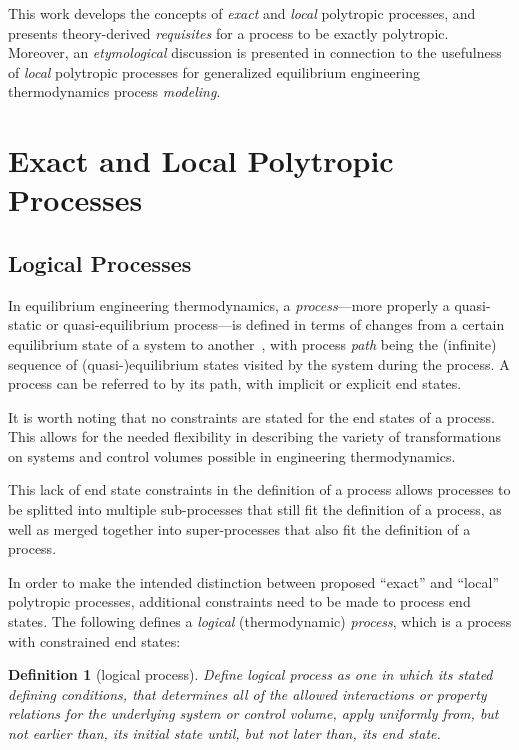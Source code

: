 \documentclass[10pt,a4paper]{article}
\newtheorem{definition}{Definition}
\begin{document}
\begin{multicols*}{2}
    This work develops the concepts of \emph{exact} and \emph{local} polytropic  processes,  and
    presents theory-derived \emph{requisites} for a process to be exactly polytropic.  Moreover,
    an  \emph{etymological}  discussion  is  presented  in  connection  to  the  usefulness   of
    \emph{local} polytropic processes for  generalized  equilibrium  engineering  thermodynamics
    process \emph{modeling}.

\section{Exact and Local Polytropic Processes}

    \subsection{Logical Processes}

    In equilibrium engineering thermodynamics, a \emph{process}---more properly  a  quasi-static
    or quasi-equilibrium process---is defined in terms of changes  from  a  certain  equilibrium
    state of a system to  another~\cite{2013-CengelYA+BolesMA-AMGH},  with  process  \emph{path}
    being the (infinite) sequence of (quasi-)equilibrium states visited by the system during the
    process. A process can be referred to by its path, with implicit or explicit end states.

    It is worth noting that no constraints are stated for the end  states  of  a  process.  This
    allows for the needed flexibility in describing the variety of  transformations  on  systems
    and control volumes possible in engineering thermodynamics.

    This lack of end state constraints in the definition of a process  allows  processes  to  be
    splitted into multiple sub-processes that still fit the definition of a process, as well as
    merged together into super-processes that also fit the definition of a process.

    In order  to  make  the  intended  distinction  between  proposed  ``exact''  and  ``local''
    polytropic processes, additional constraints need to be made  to  process  end  states.  The
    following defines a \emph{logical} (thermodynamic) \emph{process}, which is a  process  with
    constrained end states:

    \begin{definition}[logical process]\label{def:logical.proc}
        Define logical process as one in which its stated defining conditions,  that  determines
        all of the allowed interactions or property  relations  for  the  underlying  system  or
        control volume, apply uniformly from, but not earlier than, its initial state until, but
        not later than, its end state.
    \end{definition}


\end{multicols*}
\end{document}
